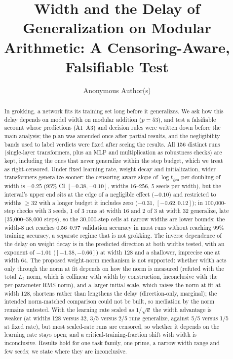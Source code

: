 \documentclass{article}
\title{Width and the Delay of Generalization on Modular Arithmetic: A Censoring-Aware, Falsifiable Test}
\author{Anonymous Author(s)}
\begin{document}
\maketitle

\begin{abstract}
In grokking, a network fits its training set long before it generalizes.
We ask how this delay depends on model width on modular addition ($p=53$), and test a falsifiable account whose predictions (A1--A3) and decision rules were written down before the main analysis; the plan was amended once after partial results, and the negligibility bands used to label verdicts were fixed after seeing the results.
All 156 distinct runs (single-layer transformers, plus an MLP and multiplication as robustness checks) are kept, including the ones that never generalize within the step budget, which we treat as right-censored.
Under fixed learning rate, weight decay and initialization, wider transformers generalize sooner: the censoring-aware slope of $\log t_{\text{gen}}$ per doubling of width is $-0.25$ (95\% CI $[-0.38,-0.10]$, widths $16$--$256$, 5 seeds per width), but the interval's upper end sits at the edge of a negligible effect ($-0.10$) and restricted to widths $\ge32$ with a longer budget it includes zero ($-0.31$, $[-0.62,0.12]$); in 100{,}000-step checks with 3 seeds, 1 of 3 runs at width 16 and 2 of 3 at width 32 generalize, late (35{,}000--58{,}000 steps), so the 30{,}000-step cells at narrow widths are lower bounds; the width-8 net reaches 0.56--0.97 validation accuracy in most runs without reaching $99\%$ training accuracy, a separate regime that is not grokking.
The inverse dependence of the delay on weight decay is in the predicted direction at both widths tested, with an exponent of $-1.01$ ($[-1.38,-0.66]$) at width 128 and a shallower, imprecise one at width 64.
The proposed weight-norm mechanism is not supported: whether width acts only through the norm at fit depends on how the norm is measured (refuted with the total $L_2$ norm, which is collinear with width by construction, inconclusive with the per-parameter RMS norm), and a larger initial scale, which raises the norm at fit at width 128, shortens rather than lengthens the delay (direction-only, marginal); the intended norm-matched comparison could not be built, so mediation by the norm remains untested.
With the learning rate scaled as $1/\sqrt d$ the width advantage is weaker (at widths 128 versus 32, 3/5 versus 2/5 runs generalize, against 5/5 versus 1/5 at fixed rate), but most scaled-rate runs are censored, so whether it depends on the learning rate stays open; and a critical-training-fraction shift with width is inconclusive.
Results hold for one task family, one prime, a narrow width range and few seeds; we state where they are inconclusive.
\end{abstract}
\end{document}
